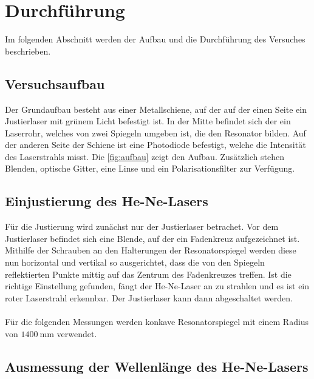 \section{Durchführung}
\label{sec:durchfuehrung}

    Im folgenden Abschnitt werden der Aufbau und die Durchführung des Versuches beschrieben.

\subsection{Versuchsaufbau}
\label{sec:versuchsaufbau}

    Der Grundaufbau besteht aus einer Metallschiene,
    auf der auf der einen Seite ein Justierlaser mit grünem Licht befestigt ist.
    In der Mitte befindet sich der ein Laserrohr,
    welches von zwei Spiegeln umgeben ist,
    die den Resonator bilden.
    Auf der anderen Seite der Schiene ist eine Photodiode befestigt,
    welche die Intensität des Laserstrahls misst.
    Die \autoref{fig:aufbau} zeigt den Aufbau.
    Zusätzlich stehen Blenden, optische Gitter, eine Linse und ein Polarisationsfilter zur Verfügung.

\subsection{Einjustierung des He-Ne-Lasers}

    Für die Justierung wird zunächst nur der Justierlaser betrachet.
    Vor dem Justierlaser befindet sich eine Blende,
    auf der ein Fadenkreuz aufgezeichnet ist.
    Mithilfe der Schrauben an den Halterungen der Resonatorspiegel werden diese nun horizontal und vertikal so ausgerichtet,
    dass die von den Spiegeln reflektierten Punkte mittig auf das Zentrum des Fadenkreuzes treffen.
    Ist die richtige Einstellung gefunden,
    fängt der He-Ne-Laser an zu strahlen und es ist ein roter Laserstrahl erkennbar.
    Der Justierlaser kann dann abgeschaltet werden.\\
    \\
    Für die folgenden Messungen werden konkave Resonatorspiegel mit einem Radius von $\SI{1400}{\milli\meter}$ verwendet.

\subsection{Ausmessung der Wellenlänge des He-Ne-Lasers}

